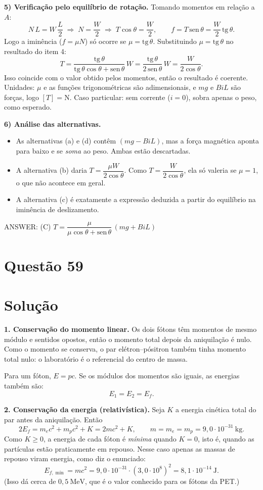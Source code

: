 \documentclass{article}%
\begin{document}
\textbf{5) Verificação pelo equilíbrio de rotação.} Tomando momentos em relação a $A$:
\[
N\,L = W\,\frac{L}{2} \;\Rightarrow\; N=\frac{W}{2} \;\Rightarrow\; T\cos\theta=\frac{W}{2},
\qquad f=T\,\text{sen}\,\theta=\frac{W}{2}\,\text{tg}\,\theta .
\]
Logo a iminência ($f=\mu N$) só ocorre se $\mu=\text{tg}\,\theta$. Substituindo $\mu=\text{tg}\,\theta$ no resultado do item 4:
\[
T=\frac{\text{tg}\,\theta}{\text{tg}\,\theta\cos\theta+\text{sen}\,\theta}\,W=\frac{\text{tg}\,\theta}{2\,\text{sen}\,\theta}\,W=\frac{W}{2\cos\theta}.
\]
Isso coincide com o valor obtido pelos momentos, então o resultado é coerente. Unidades: $\mu$ e as funções trigonométricas são adimensionais, e $mg$ e $BiL$ são forças, logo $[T]=\text{N}$. Caso particular: sem corrente ($i=0$), sobra apenas o peso, como esperado.

\textbf{6) Análise das alternativas.}
\begin{itemize}
\item As alternativas (a) e (d) contêm $(mg-BiL)$, mas a força magnética aponta para baixo e se \emph{soma} ao peso. Ambas estão descartadas.
\item A alternativa (b) daria $T=\dfrac{\mu W}{2\cos\theta}$. Como $T=\dfrac{W}{2\cos\theta}$, ela só valeria se $\mu=1$, o que não acontece em geral.
\item A alternativa (c) é exatamente a expressão deduzida a partir do equilíbrio na iminência de deslizamento.
\end{itemize}

ANSWER: (C) $T=\dfrac{\mu}{\mu\cos\theta+\text{sen}\,\theta}\,(mg+BiL)$%
\newpage%
\section*{Questão 59}

\section*{Solução}

\textbf{1. Conservação do momento linear.} Os dois fótons têm momentos de mesmo módulo e sentidos opostos, então o momento total depois da aniquilação é nulo. Como o momento se conserva, o par elétron--pósitron também tinha momento total nulo: o laboratório é o referencial do centro de massa.

Para um fóton, $E = pc$. Se os módulos dos momentos são iguais, as energias também são:
\[
E_1 = E_2 = E_f .
\]

\textbf{2. Conservação da energia (relativística).} Seja $K$ a energia cinética total do par antes da aniquilação. Então
\[
2E_f = m_e c^2 + m_p c^2 + K = 2mc^2 + K, \qquad m = m_e = m_p = 9{,}0\cdot 10^{-31}\ \text{kg}.
\]
Como $K \geq 0$, a energia de cada fóton é \emph{mínima} quando $K = 0$, isto é, quando as partículas estão praticamente em repouso. Nesse caso apenas as massas de repouso viram energia, como diz o enunciado:
\[
E_{f,\min} = mc^2 = 9{,}0\cdot 10^{-31}\cdot\left(3{,}0\cdot 10^{8}\right)^2 = 8{,}1\cdot 10^{-14}\ \text{J}.
\]
(Isso dá cerca de $0{,}5\ \text{MeV}$, que é o valor conhecido para os fótons da PET.)
\end{document}
